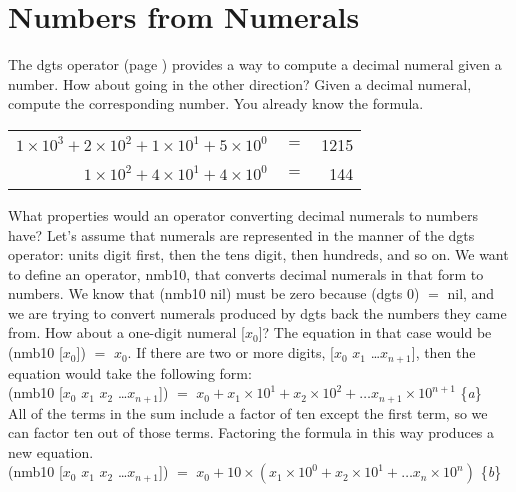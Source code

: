 \section{Numbers from Numerals}
\label{sec:numbers-from-numerals}
The \textsf{dgts} operator (page \pageref{dgts-defun})
provides a way to compute a decimal
numeral given a number. How about going in the other direction?
Given a decimal numeral, compute the corresponding number.
You already know the formula.
\begin{samepage}
\begin{center}
\begin{tabular}{rrr}
$1 \times 10^3 + 2 \times 10^2 + 1 \times 10^1 + 5 \times 10^0$ &$=$ & 1215 \\
$1 \times 10^2 + 4 \times 10^1 + 4 \times 10^0$                 &$=$ &  144 \\
\end{tabular}
\end{center}
\end{samepage}

What properties would an operator
converting decimal numerals to numbers have?
Let's assume that numerals are represented
in the manner of the \textsf{dgts} operator:
units digit first,
then the tens digit, then hundreds, and so on.
We want to define an operator, \textsf{nmb10},
that converts decimal numerals in that form to numbers.
We know that \textsf{(nmb10 nil)} must be zero
because \textsf{(dgts 0)} $=$ \textsf{nil},
and we are trying to convert numerals produced by \textsf{dgts}
back the numbers they came from.
How about a one-digit numeral \textsf{[$x_0$]}?
The equation in that case would be \textsf{(nmb10 [$x_0$])} $=$ $x_0$.
If there are two or more digits,
\textsf{[$x_0$ $x_1$ \dots $x_{n+1}$]},
then the equation would take the following form:\\
\hspace*{1cm}
\textsf{(nmb10 [$x_0$ $x_1$ $x_2$ \dots $x_{n+1}$])} $=$
$x_0 + x_1 \times 10^1 + x_2 \times 10^2 + \dots x_{n+1} \times 10^{n+1}$ \hfill \{\emph{a}\}\\

All of the terms in the sum
include a factor of ten except the first term,
so we can factor ten out of those terms.
Factoring the formula in this way produces a new equation.\\
\hspace*{1cm}
\textsf{(nmb10 [$x_0$ $x_1$ $x_2$ \dots $x_{n+1}$])} $=$
$x_0 + 10 \times (x_1 \times 10^0 + x_2 \times 10^1 + \dots x_n \times 10^n)$ \hfill \{\emph{b}\}\\

